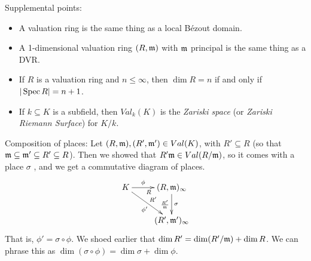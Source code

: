  \setcounter{lecture}{32}

 Supplemental points:
 \begin{itemize}
   \item A valuation ring is the same thing as a local B\'ezout domain.
   \item A 1-dimensional valuation ring $(R,\mathfrak{m})$ with $\mathfrak{m}$ principal is the same thing as a DVR.
   \item If $R$ is a valuation ring and $n\le \infty$, then $\dim R=n$ if and only if
   $|\operatorname{Spec} R|=n+1$.
   \item If $k\subseteq K$ is a subfield, then $Val_k(K)$ is the \emph{Zariski space} (or
   \emph{Zariski Riemann Surface}) for $K/k$.
 \end{itemize}

 Composition of places: Let $(R,\mathfrak{m}),(R',\mathfrak{m}')\in Val(K)$, with $R'\subseteq R$ (so that
 $\mathfrak{m}\subseteq \mathfrak{m}'\subseteq R'\subseteq R$). Then we showed that $R'\mathfrak{m}\in Val(R/\mathfrak{m})$, so
 it comes with a place $\sigma$ \anton{}, and we get a commutative diagram of places.
 \[\xymatrix{
  K \ar[r]^<>(.5)\phi_R \ar[dr]_{\phi'}^{R'} & (R,\m)_\infty \ar[d]^\sigma_{\frac{R'}{\m}}\\
  & (R',\m')_\infty
 }\]
 That is, $\phi'=\sigma\circ \phi$. We shoed earlier that $\dim R'=\dim (R'/\mathfrak{m})+\dim R$.
 We can phrase this as $\dim (\sigma\circ \phi)=\dim \sigma + \dim \phi$.

